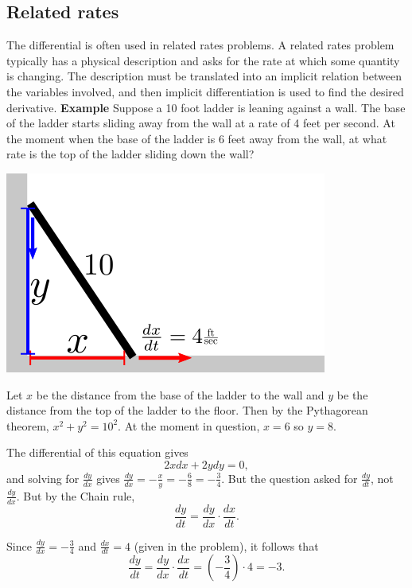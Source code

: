 \documentclass[twoside,openright,titlepage,a4paper]{book}
\begin{document}
\begin{sloppypar}
\subsection{Related rates}			

The differential is often used in related rates problems. A related rates problem typically has a physical description and asks for the rate at which some quantity is changing. The description must be translated into an implicit relation between the variables involved, and then implicit differentiation is used to find the desired derivative.
\bigbreak
\textbf{Example} Suppose a 10 foot ladder is leaning against a wall. The base of the ladder starts sliding away from the wall at a rate of 4 feet per second. At the moment when the base of the ladder is 6 feet away from the wall, at what rate is the top of the ladder sliding down the wall?
\begin{examplebox}
\begin{center}\includegraphics[scale=0.6]{Ladder}\end{center}		
Let $x$ be the distance from the base of the ladder to the wall and $y$ be the distance from the top of the ladder to the floor. Then by the Pythagorean theorem, $x^2+y^2 = 10^2$. At the moment in question, $x=6$ so $y=8$.

The differential of this equation gives
\begin{equation*} 2xdx+2ydy = 0, \end{equation*}
and solving for $\frac{dy}{dx}$ gives $\frac{dy}{dx} = -\frac{x}{y} = -\frac{6}{8} = -\frac{3}{4}$. But the question asked for $\frac{dy}{dt}$, not $\frac{dy}{dx}$. But by the Chain rule,
\begin{equation*} \frac{dy}{dt} = \frac{dy}{dx}\cdot \frac{dx}{dt}. \end{equation*}

Since $\frac{dy}{dx} = -\frac{3}{4}$ and $\frac{dx}{dt} = 4$ (given in the problem), it follows that
\begin{equation*} 
\frac{dy}{dt} = \frac{dy}{dx}\cdot \frac{dx}{dt} = \left(-\frac{3}{4}\right) \cdot 4 = -3.
\end{equation*}


\end{examplebox}
\end{sloppypar}
\end{document}
